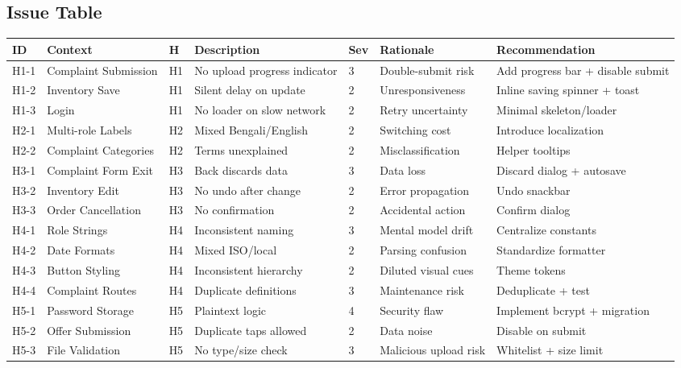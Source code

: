 \documentclass[11pt,a4paper]{article}
\begin{document}
\subsection{Issue Table}
\setlength{\tabcolsep}{4pt}
\begin{longtable}{@{}L{1.1cm}L{2.3cm}L{1.2cm}L{4.2cm}L{0.9cm}L{2.2cm}L{3.3cm}@{}}
\toprule
\textbf{ID} & \textbf{Context} & \textbf{H} & \textbf{Description} & \textbf{Sev} & \textbf{Rationale} & \textbf{Recommendation}\\\midrule
H1-1 & Complaint Submission & H1 & No upload progress indicator & 3 & Double-submit risk & Add progress bar + disable submit \\
H1-2 & Inventory Save & H1 & Silent delay on update & 2 & Unresponsiveness & Inline saving spinner + toast \\
H1-3 & Login & H1 & No loader on slow network & 2 & Retry uncertainty & Minimal skeleton/loader \\
H2-1 & Multi-role Labels & H2 & Mixed Bengali/English & 2 & Switching cost & Introduce localization \\
H2-2 & Complaint Categories & H2 & Terms unexplained & 2 & Misclassification & Helper tooltips \\
H3-1 & Complaint Form Exit & H3 & Back discards data & 3 & Data loss & Discard dialog + autosave \\
H3-2 & Inventory Edit & H3 & No undo after change & 2 & Error propagation & Undo snackbar \\
H3-3 & Order Cancellation & H3 & No confirmation & 2 & Accidental action & Confirm dialog \\
H4-1 & Role Strings & H4 & Inconsistent naming & 3 & Mental model drift & Centralize constants \\
H4-2 & Date Formats & H4 & Mixed ISO/local & 2 & Parsing confusion & Standardize formatter \\
H4-3 & Button Styling & H4 & Inconsistent hierarchy & 2 & Diluted visual cues & Theme tokens \\
H4-4 & Complaint Routes & H4 & Duplicate definitions & 3 & Maintenance risk & Deduplicate + test \\
H5-1 & Password Storage & H5 & Plaintext logic & 4 & Security flaw & Implement bcrypt + migration \\
H5-2 & Offer Submission & H5 & Duplicate taps allowed & 2 & Data noise & Disable on submit \\
H5-3 & File Validation & H5 & No type/size check & 3 & Malicious upload risk & Whitelist + size limit \\

\end{longtable}
\end{document}
